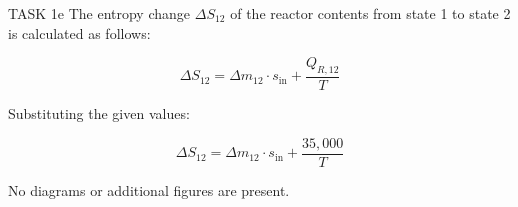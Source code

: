 TASK 1e  
The entropy change \( \Delta S_{12} \) of the reactor contents from state 1 to state 2 is calculated as follows:  

\[
\Delta S_{12} = \Delta m_{12} \cdot s_{\text{in}} + \frac{Q_{R,12}}{T}
\]

Substituting the given values:  

\[
\Delta S_{12} = \Delta m_{12} \cdot s_{\text{in}} + \frac{35{,}000}{T}
\]  

No diagrams or additional figures are present.